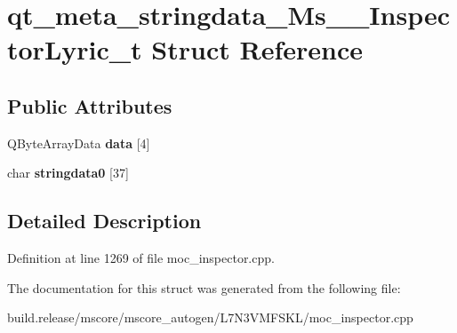 \hypertarget{structqt__meta__stringdata___ms_____inspector_lyric__t}{}\section{qt\+\_\+meta\+\_\+stringdata\+\_\+\+Ms\+\_\+\+\_\+\+Inspector\+Lyric\+\_\+t Struct Reference}
\label{structqt__meta__stringdata___ms_____inspector_lyric__t}
\subsection*{Public Attributes}
\begin{DoxyCompactItemize}
\item 
\mbox{\label{structqt__meta__stringdata___ms_____inspector_lyric__t_ac96bf69167e352ff1443a392ef4f6ff2}} 
Q\+Byte\+Array\+Data {\bfseries data} \mbox{[}4\mbox{]}
\item 
\mbox{\label{structqt__meta__stringdata___ms_____inspector_lyric__t_a3cf68ce01133293824d78a799921c55e}} 
char {\bfseries stringdata0} \mbox{[}37\mbox{]}
\end{DoxyCompactItemize}


\subsection{Detailed Description}


Definition at line 1269 of file moc\+\_\+inspector.\+cpp.



The documentation for this struct was generated from the following file\+:\begin{DoxyCompactItemize}
\item 
build.\+release/mscore/mscore\+\_\+autogen/\+L7\+N3\+V\+M\+F\+S\+K\+L/moc\+\_\+inspector.\+cpp\end{DoxyCompactItemize}
